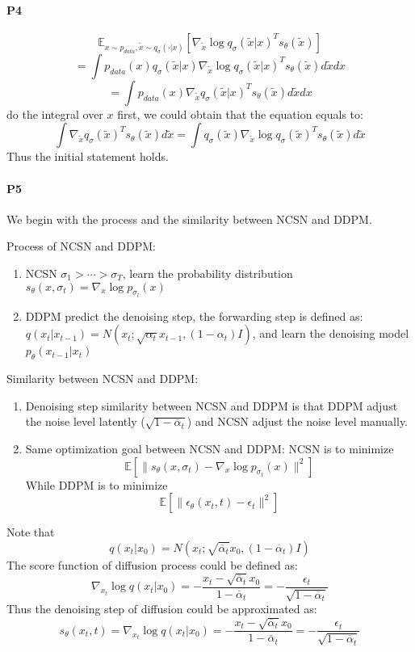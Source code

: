 \documentclass[a4 paper,12pt]{article}
\theoremstyle{definitionstyle}
\newenvironment{framedminipage}
    {\begin{framed}\begin{minipage}{0.9\textwidth}}
    {\end{minipage}\end{framed}}
\begin{document}
\paragraph{P4}
\[
  \mathbb{E}_{x\sim p_{data},\tilde{x}\sim q_\sigma(\cdot|x)}\left[\nabla_{\tilde{x}}\log q_\sigma(\tilde{x}|x)^{T} s_\theta (\tilde{x})\right]
\]
\[
  =\int p_{data}(x)q_\sigma(\tilde{x}|x)\nabla_{\tilde{x}}\log q_\sigma(\tilde{x}|x)^{T} s_\theta (\tilde{x})d\tilde{x}dx
\]
\[
  =\int p_{data}(x)\nabla_{\tilde{x}}q_\sigma(\tilde{x}|x)^{T} s_\theta (\tilde{x})d\tilde{x}dx
\]
do the integral over $x$ first, we could obtain that the equation equals to:
\[
  \int \nabla_{\tilde{x}}q_{\sigma}(\tilde{x})^Ts_\theta(\tilde{x})d\tilde{x}=\int q_\sigma(\tilde{x})\nabla_{\tilde{x}}\log q_\sigma(\tilde{x})^Ts_\theta(\tilde{x})d\tilde{x}
\]
Thus the initial statement holds.
\paragraph{P5}
We begin with the process and the similarity between NCSN and DDPM.
\begin{framedminipage}
Process of NCSN and DDPM:
\begin{enumerate}
  \item NCSN $\sigma_1>\cdots>\sigma_T$, learn the probability distribution $s_\theta(x,\sigma_t)=\nabla_x \log p_{\sigma_l}(x)$
  \item DDPM predict the denoising step, the forwarding step is defined as: $q(x_t|x_{t-1})=N(x_t;\sqrt{\alpha_t}x_{t-1},(1-\alpha_t)I)$, and learn the denoising model $p_\theta(x_{t-1}|x_t)$
\end{enumerate}
\end{framedminipage}
\begin{framedminipage}
Similarity between NCSN and DDPM:
\begin{enumerate}
  \item Denoising step similarity between NCSN and DDPM is that DDPM adjust the noise level latently ($\sqrt{1-\overline\alpha_t}$) and NCSN adjust the noise level manually.
  \item Same optimization goal between NCSN and DDPM: NCSN is to minimize $$\mathbb{E}\left[\|s_\theta(x,\sigma_t)-\nabla_x\log p_{\sigma_t}(x)\|^2\right]$$ While DDPM is to minimize $$\mathbb{E}\left[\|\epsilon_\theta(x_t,t)-\epsilon_t\|^2\right]$$
\end{enumerate}
\end{framedminipage}
Note that 
\[
  q(x_t|x_0)=N(x_t;\sqrt{\overline\alpha_t}x_0,(1-\overline\alpha_t)I)
\]
The score function of diffusion process could be defined as:
\[
  \nabla_{x_t}\log q(x_t|x_0)=-\frac{x_t-\sqrt{\overline\alpha_t}x_0}{1-\overline\alpha_t}=-\frac{\epsilon_t}{\sqrt{1-\overline\alpha_t}}
\]
Thus the denoising step of diffusion could be approximated as:
\[
  s_\theta(x_t,t)=\nabla_{x_t}\log q(x_t|x_0)=-\frac{x_t-\sqrt{\overline\alpha_t}x_0}{1-\overline\alpha_t}=-\frac{\epsilon_t}{\sqrt{1-\overline\alpha_t}}
\]
\end{document}
